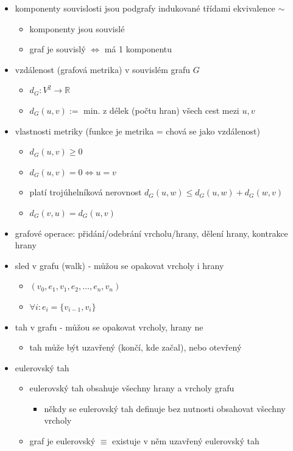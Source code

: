 \begin{itemize}
\begin{itemize}
\item komponenty souvislosti jsou podgrafy indukované třídami ekvivalence $\sim$
\begin{itemize}
\item komponenty jsou souvislé
\item graf je souvislý $\iff$ má 1 komponentu
\end{itemize}
\item vzdálenost (grafová metrika) v souvislém grafu $G$
\begin{itemize}
\item $d_G:V^2\to\mathbb R$
\item $d_G(u,v):=$ min. z délek (počtu hran) všech cest mezi $u,v$
\end{itemize}
\item vlastnosti metriky (funkce je metrika = chová se jako vzdálenost)
\begin{itemize}
\item $d_G(u,v)\geq 0$
\item $d_G(u,v) = 0 \iff u=v$
\item platí trojúhelníková nerovnost $d_G(u,w) \leq d_G(u,w) + d_G(w,v)$
\item $d_G(v,u)=d_G(u,v)$
\end{itemize}
\item grafové operace: přidání/odebrání vrcholu/hrany, dělení hrany, kontrakce hrany
\item sled v grafu (walk) - můžou se opakovat vrcholy i hrany
\begin{itemize}
\item $(v_0,e_1,v_1,e_2,\dots,e_n,v_n)$
\item $\forall i: e_i=\lbrace v_{i-1},v_i\rbrace$
\end{itemize}
\item tah v grafu - můžou se opakovat vrcholy, hrany ne
\begin{itemize}
\item tah může být uzavřený (končí, kde začal), nebo otevřený
\end{itemize}
\item eulerovský tah
\begin{itemize}
\item eulerovský tah obsahuje všechny hrany a vrcholy grafu
\begin{itemize}
\item někdy se eulerovský tah definuje bez nutnosti obsahovat všechny vrcholy
\end{itemize}
\item graf je eulerovský $\equiv$ existuje v něm uzavřený eulerovský tah

\end{itemize}
\end{itemize}
\end{itemize}

